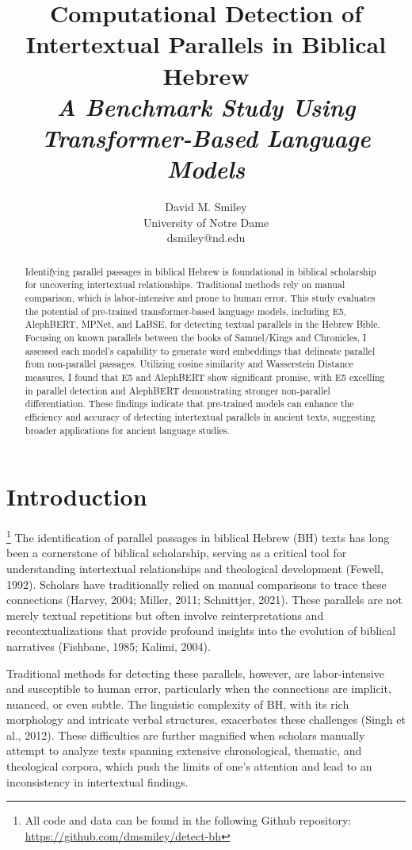 \documentclass[12pt]{article}
\title{
    \LARGE\bfseries
    Computational Detection of \\
    Intertextual Parallels in Biblical Hebrew \\[1.2ex]
    \Large\itshape
    A Benchmark Study Using \\ Transformer-Based Language Models
}
\author{David M. Smiley\\University of Notre Dame\\dsmiley@nd.edu}
\date{}
\begin{document}
\maketitle

\begin{abstract}
Identifying parallel passages in biblical Hebrew is foundational in biblical scholarship for uncovering intertextual relationships. Traditional methods rely on manual comparison, which is labor-intensive and prone to human error. This study evaluates the potential of pre-trained transformer-based language models, including E5, AlephBERT, MPNet, and LaBSE, for detecting textual parallels in the Hebrew Bible. Focusing on known parallels between the books of Samuel/Kings and Chronicles, I assessed each model’s capability to generate word embeddings that delineate parallel from non-parallel passages. Utilizing cosine similarity and Wasserstein Distance measures, I found that E5 and AlephBERT show significant promise, with E5 excelling in parallel detection and AlephBERT demonstrating stronger non-parallel differentiation. These findings indicate that pre-trained models can enhance the efficiency and accuracy of detecting intertextual parallels in ancient texts, suggesting broader applications for ancient language studies. \end{abstract}

\section{Introduction}
\footnote{All code and data can be found in the following Github repository: \url{https://github.com/dmsmiley/detect-bh}}
The identification of parallel passages in biblical Hebrew (BH) texts has long been a cornerstone of biblical scholarship, serving as a critical tool for understanding intertextual relationships and theological development (Fewell, 1992). Scholars have traditionally relied on manual comparisons to trace these connections (Harvey, 2004; Miller, 2011; Schnittjer, 2021). These parallels are not merely textual repetitions but often involve reinterpretations and recontextualizations that provide profound insights into the evolution of biblical narratives (Fishbane, 1985; Kalimi, 2004).

Traditional methods for detecting these parallels, however, are labor-intensive and susceptible to human error, particularly when the connections are implicit, nuanced, or even subtle. The linguistic complexity of BH, with its rich morphology and intricate verbal structures, exacerbates these challenges (Singh et al., 2012). These difficulties are further magnified when scholars manually attempt to analyze texts spanning extensive chronological, thematic, and theological corpora, which push the limits of one’s attention and lead to an inconsistency in intertextual findings.
\end{document}
